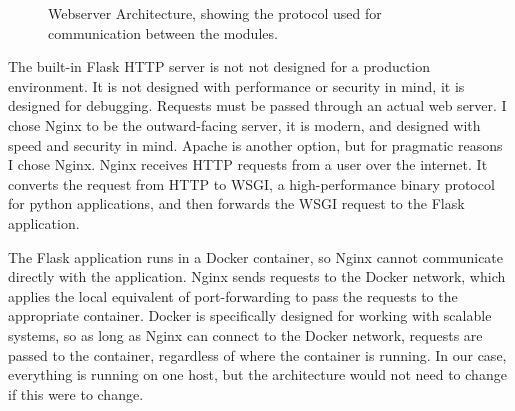 \begin{figure}[htpb]
  \begin{center}
  \end{center}
  \caption{Webserver Architecture, showing the protocol used for
    communication between the modules.}
  \label{fig:webserver_architecture}
\end{figure}

The built-in Flask HTTP server is not not designed for a production
environment. It is not designed with performance or security in mind, it
is designed for debugging. Requests must be passed through an actual web
server. I chose Nginx to be the outward-facing server, it is modern, and
designed with speed and security in mind. Apache is another option, but
for pragmatic reasons I chose Nginx. Nginx receives HTTP requests from a
user over the internet. It converts the request from HTTP to WSGI, a
high-performance binary protocol for python applications, and then
forwards the WSGI request to the Flask application.

The Flask application runs in a Docker container, so Nginx cannot
communicate directly with the application. Nginx sends requests to the
Docker network, which applies the local equivalent of port-forwarding to
pass the requests to the appropriate container. Docker is specifically
designed for working with scalable systems, so as long as Nginx can
connect to the Docker network, requests are passed to the container,
regardless of where the container is running. In our case, everything is
running on one host, but the architecture would not need to change if
this were to change.

